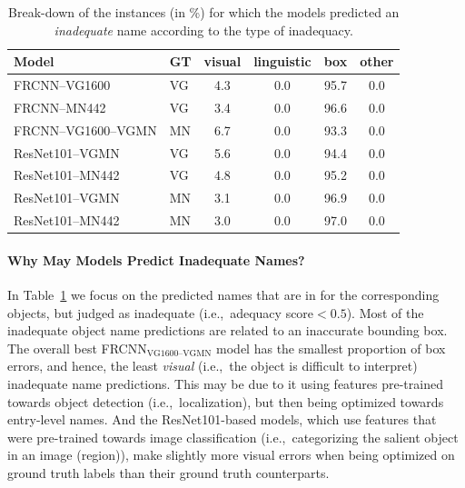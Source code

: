 \begin{table}[t]
	\centering
	\small
\begin{tabular}{ll|c@{~}c@{~}c@{~}c}
	\toprule
	{Model} &  GT & visual &  linguistic &  box &  other \\
	\midrule
	FRCNN--VG1600 & VG &             4.3 &                 0.0 &                  95.7 &            0.0 \\
	FRCNN--MN442 & VG &             3.4 &                 0.0 &                  96.6 &            0.0 \\
	\midrule
	FRCNN--VG1600--VGMN & MN &             6.7 &                 0.0 &                  93.3 &            0.0 \\
	\midrule
	ResNet101--VGMN & VG &             5.6 &                 0.0 &                  94.4 &            0.0 \\
	ResNet101--MN442 & VG &             4.8 &                 0.0 &                  95.2 &            0.0 \\
	ResNet101--VGMN & MN &             3.1 &                 0.0 &                  96.9 &            0.0 \\
	ResNet101--MN442 & MN &             3.0 &                 0.0 &                  97.0 &            0.0 \\
	\bottomrule
\end{tabular}
\caption{Break-down of the instances (in \%) for which the models predicted an \textit{inadequate} name according to the type of inadequacy.  \label{tab:exp_inadequacy}}
\end{table}

\paragraph{Why May Models Predict Inadequate Names?}
In Table~\ref{tab:exp_inadequacy} we focus on the predicted names that are in \mn for the corresponding objects, but judged as inadequate (i.e.,~adequacy score$<0.5$). 
Most of the inadequate object name predictions are related to an inaccurate bounding box. 
The overall best FRCNN$_{\text{VG1600--VGMN}}$ model has the smallest proportion of box errors, and hence, the least \textit{visual} (i.e.,~the object is difficult to interpret) inadequate name predictions. 
This may be due to it using features pre-trained towards object detection (i.e.,~localization), but then being optimized towards \mn entry-level names. 
And the ResNet101-based models, which use features that were pre-trained towards image classification (i.e.,~categorizing the salient object in an image (region)), make slightly more visual errors when being optimized on \vg ground truth labels than their \mn ground truth counterparts. 


